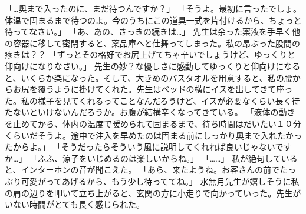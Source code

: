 「…奥まで入ったのに、まだ待つんですか？」
「そうよ。最初に言ったでしょ。体温で固まるまで待つのよ。今のうちにこの道具一式を片付けるから、ちょっと待ってなさい。」
「あ、あの、さっきの続きは…」
先生は余った薬液を手早く他の容器に移して密閉すると、薬品庫へと仕舞ってしまった。私の昂ぶった股間の疼きは？？
「ずっとその格好でお尻上げてちゃ辛いでしょうけど、ゆっくりと仰向けになりなさい。」
先生の妙？な優しさに感動してゆっくりと仰向けになると、いくらか楽になった。そして、大きめのバスタオルを用意すると、私の腰からお尻を覆うように掛けてくれた。先生はベッドの横にイスを出してきて座った。私の様子を見てくれるってことなんだろうけど、イスが必要なくらい長く待たないといけないんだろうか。お腹が結構辛くなってきている。
「液体の動きを止めてから、体内の温度で暖められて固まるまで、待ち時間はだいたい１０分くらいだそうよ。途中で注入を早めたのは固まる前にしっかり奥まで入れたかったからよ。」
「そうだったらそういう風に説明してくれれば良いじゃないですか…」
「ふふ、涼子をいじめるのは楽しいからね。」
「……」
私が絶句していると、インターホンの音が聞こえた。
「あら、来たようね。お客さんの前でたっぷり可愛がってあげるから、もう少し待っててね。」
水無月先生が嬉しそうに私の肩の辺りを叩いて立ち上がると、玄関の方に小走りで向かっていった。先生がいない時間がとても長く感じられた。

